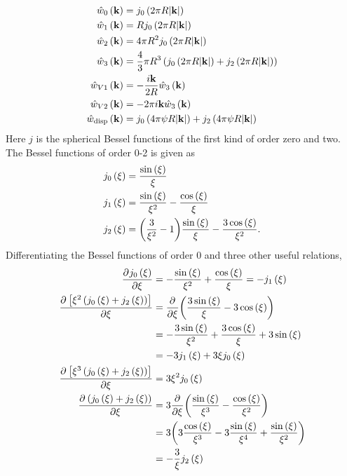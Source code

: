 \documentclass[12pt, letterpaper]{article}
\newcommand*{\pd}[3][]{\frac{\partial^{#1}#2}{\partial{#3}^{#1}}}%
\newcommand*{\lb}{\ensuremath{\left(}}
\newcommand*{\rb}{\ensuremath{\right)}}
\begin{document}
\begin{align}
  \label{eq:weight_functions_fourier}
  \hat{w}_0 \lb \mathbf{k}\rb &= j_0\lb 2 \pi R |\mathbf{k}| \rb  \\
  \hat{w}_1 \lb \mathbf{k}\rb &= R j_0\lb 2 \pi R |\mathbf{k}| \rb  \\
  \hat{w}_2 \lb \mathbf{k}\rb &= 4 \pi R^2 j_0\lb 2 \pi R |\mathbf{k}| \rb  \\
  \hat{w}_3 \lb \mathbf{k}\rb &= \frac{4}{3} \pi R^3 \lb j_0\lb 2 \pi R |\mathbf{k}| \rb + j_2\lb 2 \pi R |\mathbf{k}| \rb \rb  \\
  \hat{w}_{V1} \lb \mathbf{k}\rb &= - \frac{i \mathbf{k}}{2 R} \hat{w}_3 \lb \mathbf{k}\rb  \\
  \hat{w}_{V2} \lb \mathbf{k}\rb &= - 2 \pi i \mathbf{k} \hat{w}_3 \lb \mathbf{k}\rb  \\
  \hat{w}_{\rm{disp}} \lb \mathbf{k}\rb &= j_0\lb 4 \pi \psi R |\mathbf{k}| \rb + j_2\lb 4 \pi \psi R |\mathbf{k}| \rb
\end{align}
Here $j$ is the spherical Bessel functions of the first kind of order
zero and two. The Bessel functions of order 0-2 is given as
\begin{align}
  \label{eq:bessel_functions}
  j_0\lb \xi \rb &= \frac{\sin \lb \xi \rb}{\xi} \\
  j_1\lb \xi \rb &= \frac{\sin \lb \xi \rb}{\xi^2} - \frac{\cos \lb \xi \rb}{\xi}  \\
  j_2\lb \xi \rb &= \biggl(\frac{3}{\xi^2} - 1\biggr) \frac{\sin \lb \xi \rb}{\xi} - \frac{3 \cos \lb \xi \rb}{\xi^2}.
\end{align}
Differentiating the Bessel functions of order 0 and three other useful relations,
\begin{align}
  \label{eq:bessel_function_differentials}
  \pd{j_0\lb \xi \rb}{\xi} &= -\frac{\sin \lb \xi \rb}{\xi^2} + \frac{\cos \lb \xi \rb}{\xi} = - j_1\lb \xi \rb\\
  \pd{\left[\xi^2\lb j_0\lb \xi \rb + j_2\lb \xi \rb\rb\right]}{\xi} &= \pd{}{\xi} \biggl(\frac{3\sin \lb \xi \rb}{\xi} - 3 \cos \lb \xi \rb\biggr) \nonumber \\
                           &= -\frac{3\sin \lb \xi \rb}{\xi^2} + \frac{3\cos \lb \xi \rb}{\xi} + 3 \sin \lb \xi \rb \nonumber \\
                           &= -3j_1\lb \xi \rb + 3 \xi j_0\lb \xi \rb\\
  \pd{\left[\xi^3\lb j_0\lb \xi \rb + j_2\lb \xi \rb\rb\right]}{\xi} &= 3 \xi^2 j_0\lb \xi \rb \\
  \pd{\lb j_0\lb \xi \rb + j_2\lb \xi \rb\rb}{\xi} &= 3\pd{}{\xi} \biggl(\frac{\sin \lb \xi \rb}{\xi^3} - \frac{\cos \lb \xi \rb}{\xi^2}\biggr) \nonumber \\
                           &= 3 \biggl(3\frac{\cos \lb \xi \rb}{\xi^3} - 3 \frac{\sin \lb \xi \rb}{\xi^4} + \frac{\sin \lb \xi \rb}{\xi^2}\biggr) \nonumber \\
                           &= -\frac{3}{\xi} j_2\lb \xi \rb
\end{align}
\end{document}
